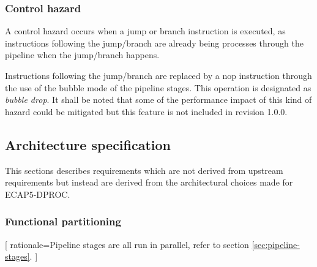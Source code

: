     \subsubsection{Control hazard}

      \label{control-hazard}

      \begin{content}
          A control hazard occurs when a jump or branch instruction is executed, as instructions following the jump/branch are already being processes through the pipeline when the jump/branch happens.

          Instructions following the jump/branch are replaced by a nop instruction through the use of the bubble mode of the pipeline stages. This operation is designated as \textit{bubble drop}. It shall be noted that some of the performance impact of this kind of hazard could be mitigated but this feature is not included in revision 1.0.0.
        \end{content}

  \subsection{Architecture specification}

    \begin{content}
        This sections describes requirements which are not derived from upstream requirements but instead are derived from the architectural choices made for ECAP5-DPROC.
      \end{content}

    \subsubsection{Functional partitioning}



      [
          rationale={Pipeline stages are all run in parallel, refer to section \ref{sec:pipeline-stages}.}
        ]

